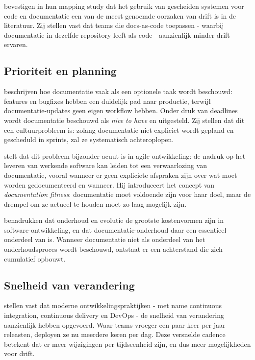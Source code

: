 \textcite{theunissen2022mappingdocumentation} bevestigen in hun mapping study dat het gebruik van gescheiden systemen voor code en documentatie een van de meest genoemde oorzaken van drift is in de literatuur. Zij stellen vast dat teams die docs-as-code toepassen - waarbij documentatie in dezelfde repository leeft als code - aanzienlijk minder drift ervaren.

\subsection{Prioriteit en planning}
\textcite{bhatti2021docsdevelopers} beschrijven hoe documentatie vaak als een optionele taak wordt beschouwd: features en bugfixes hebben een duidelijk pad naar productie, terwijl documentatie-updates geen eigen workflow hebben. Onder druk van deadlines wordt documentatie beschouwd als \textit{nice to have} en uitgesteld. Zij stellen dat dit een cultuurprobleem is: zolang documentatie niet expliciet wordt gepland en gescheduld in sprints, zal ze systematisch achteroplopen.

\textcite{ruping2005agiledocumentation} stelt dat dit probleem bijzonder acuut is in agile ontwikkeling: de nadruk op het leveren van werkende software kan leiden tot een verwaarlozing van documentatie, vooral wanneer er geen expliciete afspraken zijn over wat moet worden gedocumenteerd en wanneer. Hij introduceert het concept van \textit{documentation fitness}: documentatie moet voldoende zijn voor haar doel, maar de drempel om ze actueel te houden moet zo laag mogelijk zijn.

\textcite{tripathy2014softwareevolution} benadrukken dat onderhoud en evolutie de grootste kostenvormen zijn in software-ontwikkeling, en dat documentatie-onderhoud daar een essentieel onderdeel van is. Wanneer documentatie niet als onderdeel van het onderhoudsproces wordt beschouwd, ontstaat er een achterstand die zich cumulatief opbouwt.

\subsection{Snelheid van verandering}
\textcite{theunissen2022mappingdocumentation} stellen vast dat moderne ontwikkelingspraktijken - met name continuous integration, continuous delivery en DevOps - de snelheid van verandering aanzienlijk hebben opgevoerd. Waar teams vroeger een paar keer per jaar releasten, deployen ze nu meerdere keren per dag. Deze versnelde cadence betekent dat er meer wijzigingen per tijdseenheid zijn, en dus meer mogelijkheden voor drift.

